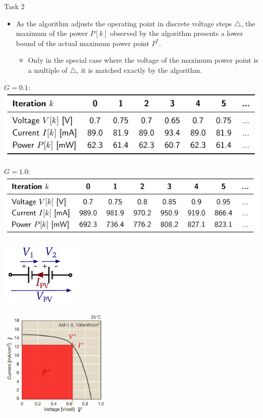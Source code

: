 \begin{frame}[allowframebreaks]{Task 2}{}
\begin{requirementsnoinc}
\begin{itemize}
       \item As the algorithm adjusts the operating point in discrete voltage steps $\triangle$, the maximum of the power $P[k]$ observed by the algorithm presents a lower bound of the actual maximum power point $P^{*}$.
        \begin{itemize}
          \item Only in the special case where the voltage of the maximum power point is a multiple of $\triangle$, it is matched exactly by the algorithm.
        \end{itemize}
    \end{itemize}
  \end{requirementsnoinc}
  \framebreak
  \begin{solutionnoinc}
     $G = 0.1$:
    \includegraphics[width=\textwidth]{./figures/task2_sol2.png}
  \end{solutionnoinc}
  \begin{solution}
     $G = 1.0$:
    \includegraphics[width=\textwidth]{./figures/task2_sol3.png}
  \end{solution}
  \begin{tasknoinc}
    \centering
    \includegraphics[width=0.3\textwidth]{./figures/task3_photovoltaic_panel.png}
  \end{tasknoinc}
  \begin{requirementsnoinc}
    \centering
    \includegraphics[width=0.4\textwidth]{./figures/task2_sweetspot.png}

\end{requirementsnoinc}
\end{frame}
